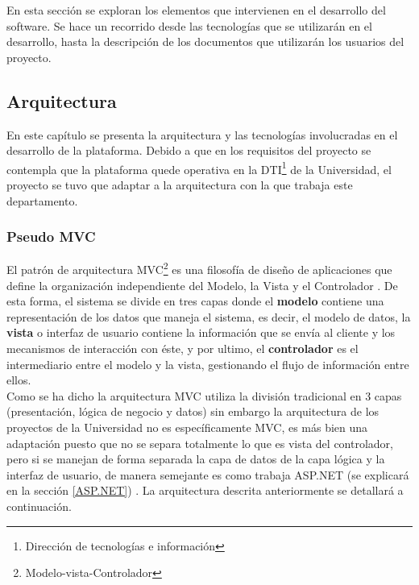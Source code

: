 En esta sección se exploran los elementos que intervienen en el desarrollo del software. Se hace un recorrido desde las tecnologías que se utilizarán en el desarrollo, hasta la descripción de los documentos que utilizarán los usuarios del proyecto.
\subsection{Arquitectura}
 
 En este capítulo se presenta la arquitectura y las tecnologías involucradas en el desarrollo de la plataforma. Debido a que en los requisitos del proyecto se contempla que la plataforma quede operativa en la  DTI\footnote{Dirección de tecnologías e información} de la Universidad, el proyecto se tuvo que adaptar a la arquitectura con la que trabaja este departamento.

\subsubsection{Pseudo MVC } \label{PseudoMVC}

El patrón de arquitectura MVC\footnote{Modelo-vista-Controlador} es una filosofía de diseño de aplicaciones que define la organización independiente del Modelo, la Vista  y el Controlador \cite{eje15}. De esta forma, el sistema se divide en tres capas donde el \textbf{modelo}  contiene una representación de los datos que maneja el sistema, es decir, el modelo de datos, la \textbf{ vista}  o interfaz de usuario contiene la información que se envía al cliente y los mecanismos de interacción con éste, y por ultimo, el \textbf{controlador} es el intermediario entre el modelo y la vista, gestionando el flujo de información entre ellos.
\\

Como se ha dicho la arquitectura MVC utiliza la división tradicional en 3 capas (presentación, lógica de negocio y datos) sin embargo la arquitectura de los proyectos de la Universidad no es específicamente  MVC, es más bien una adaptación puesto que no se separa totalmente lo que es vista del controlador, pero si se manejan de forma separada la capa de datos de la capa lógica y la interfaz de usuario, de manera semejante es como trabaja ASP.NET (se explicará en la sección \ref{ASP.NET}) . La arquitectura descrita anteriormente se detallará a continuación.
\\

